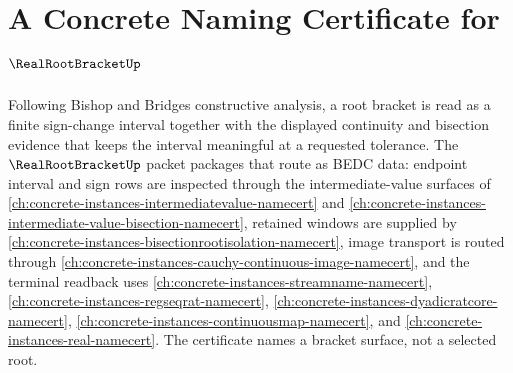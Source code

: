 \chapter{A Concrete Naming Certificate for $\RealRootBracketUp$}
\label{ch:concrete-instances-real-root-bracket-namecert}

Following Bishop and Bridges constructive analysis, a root bracket is read as a finite sign-change interval together with the displayed continuity and bisection evidence that keeps the interval meaningful at a requested tolerance. The $\RealRootBracketUp$ packet packages that route as BEDC data: endpoint interval and sign rows are inspected through the intermediate-value surfaces of \autoref{ch:concrete-instances-intermediatevalue-namecert} and \autoref{ch:concrete-instances-intermediate-value-bisection-namecert}, retained windows are supplied by \autoref{ch:concrete-instances-bisectionrootisolation-namecert}, image transport is routed through \autoref{ch:concrete-instances-cauchy-continuous-image-namecert}, and the terminal readback uses \autoref{ch:concrete-instances-streamname-namecert}, \autoref{ch:concrete-instances-regseqrat-namecert}, \autoref{ch:concrete-instances-dyadicratcore-namecert}, \autoref{ch:concrete-instances-continuousmap-namecert}, and \autoref{ch:concrete-instances-real-namecert}. The certificate names a bracket surface, not a selected root.

